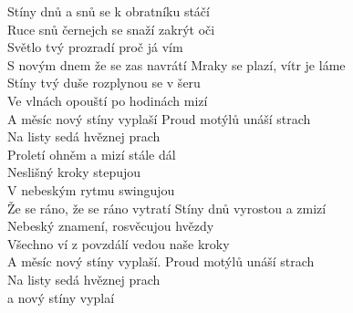 \ve
Stíny dnů a snů se k obratníku stáčí\\
Ruce snů černejch se snaží zakrýt oči\\
Světlo tvý prozradí proč já vím\\
S novým dnem že se zas navrátí
\ve
Mraky se plazí, vítr je láme\\
Stíny tvý duše rozplynou se v šeru\\
Ve vlnách opouští po hodinách mizí\\
A měsíc nový stíny vyplaší
\cho
Proud motýlů unáší strach\\
Na listy sedá hvěznej prach\\
Proletí ohněm a mizí stále dál\\
Neslišný kroky stepujou\\
V nebeským rytmu swingujou\\
Že se ráno, že se ráno vytratí
\ve
Stíny dnů vyrostou a zmizí\\
Nebeský znamení, rosvěcujou hvězdy\\
Všechno ví z povzdálí vedou naše kroky\\
A měsíc nový stíny vyplaší. 
Proud motýlů unáší strach\\
Na listy sedá hvěznej prach\\
a nový stíny vyplaí
\esong
